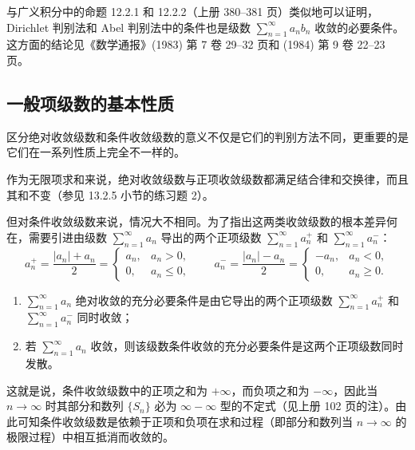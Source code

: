 \begin{xremark}
与广义积分中的命题 12.2.1 和 12.2.2（上册 380--381 页）类似地可以证明，Dirichlet 判别法和 Abel 判别法中的条件也是级数 $\sum_{n=1}^{\infty}a_nb_n$ 收敛的必要条件。这方面的结论见《数学通报》(1983) 第 7 卷 29--32 页和 (1984) 第 9 卷 22--23 页。
\end{xremark}

\subsection{一般项级数的基本性质}

区分绝对收敛级数和条件收敛级数的意义不仅是它们的判别方法不同，更重要的是它们在一系列性质上完全不一样的。

作为无限项求和来说，绝对收敛级数与正项收敛级数都满足结合律和交换律，而且其和不变（参见 13.2.5 小节的练习题 2）。

但对条件收敛级数来说，情况大不相同。为了指出这两类收敛级数的根本差异何在，需要引进由级数 $\sum_{n=1}^{\infty}a_n$ 导出的两个正项级数 $\sum_{n=1}^{\infty}a_n^+$ 和 $\sum_{n=1}^{\infty}a_n^-$：
\[
a_n^+=\frac{|a_n|+a_n}{2}=\begin{cases}a_n,&a_n>0,\\0,&a_n\leq0,\end{cases}
\qquad
a_n^-=\frac{|a_n|-a_n}{2}=\begin{cases}-a_n,&a_n<0,\\0,&a_n\geq0.\end{cases}
\]

\begin{xproposition}[13.3.3]
\begin{enumerate}[label=(\arabic*)]
\item $\sum_{n=1}^{\infty}a_n$ 绝对收敛的充分必要条件是由它导出的两个正项级数 $\sum_{n=1}^{\infty}a_n^+$ 和 $\sum_{n=1}^{\infty}a_n^-$ 同时收敛；
\item 若 $\sum_{n=1}^{\infty}a_n$ 收敛，则该级数条件收敛的充分必要条件是这两个正项级数同时发散。
\end{enumerate}
\end{xproposition}

\begin{xremark}
这就是说，条件收敛级数中的正项之和为 $+\infty$，而负项之和为 $-\infty$，因此当 $n\to\infty$ 时其部分和数列 $\{S_n\}$ 必为 $\infty-\infty$ 型的不定式（见上册 102 页的注）。由此可知条件收敛级数是依赖于正项和负项在求和过程（即部分和数列当 $n\to\infty$ 的极限过程）中相互抵消而收敛的。
\end{xremark}

